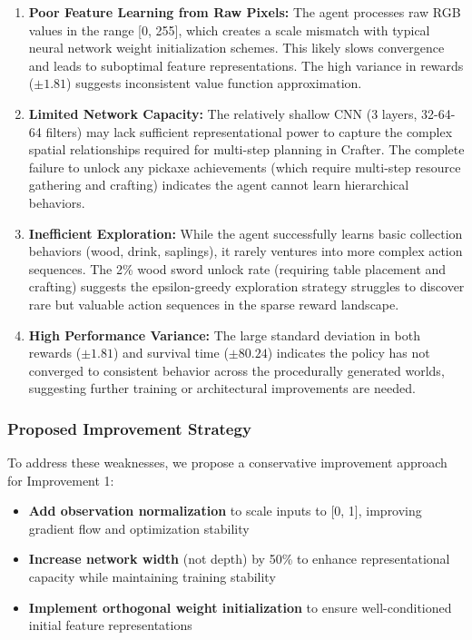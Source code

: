 \documentclass[twocolumn]{article}
\begin{document}
\begin{enumerate}
    \item \textbf{Poor Feature Learning from Raw Pixels:} The agent processes raw RGB values in the range [0, 255], which creates a scale mismatch with typical neural network weight initialization schemes. This likely slows convergence and leads to suboptimal feature representations. The high variance in rewards ($\pm 1.81$) suggests inconsistent value function approximation.
    
    \item \textbf{Limited Network Capacity:} The relatively shallow CNN (3 layers, 32-64-64 filters) may lack sufficient representational power to capture the complex spatial relationships required for multi-step planning in Crafter. The complete failure to unlock any pickaxe achievements (which require multi-step resource gathering and crafting) indicates the agent cannot learn hierarchical behaviors.
    
    \item \textbf{Inefficient Exploration:} While the agent successfully learns basic collection behaviors (wood, drink, saplings), it rarely ventures into more complex action sequences. The 2\% wood sword unlock rate (requiring table placement and crafting) suggests the epsilon-greedy exploration strategy struggles to discover rare but valuable action sequences in the sparse reward landscape.
    
    \item \textbf{High Performance Variance:} The large standard deviation in both rewards ($\pm 1.81$) and survival time ($\pm 80.24$) indicates the policy has not converged to consistent behavior across the procedurally generated worlds, suggesting further training or architectural improvements are needed.
\end{enumerate}

\subsubsection*{Proposed Improvement Strategy}

To address these weaknesses, we propose a conservative improvement approach for Improvement 1:

\begin{itemize}
    \item \textbf{Add observation normalization} to scale inputs to [0, 1], improving gradient flow and optimization stability
    \item \textbf{Increase network width} (not depth) by 50\% to enhance representational capacity while maintaining training stability
    \item \textbf{Implement orthogonal weight initialization} to ensure well-conditioned initial feature representations
\end{itemize}
\end{document}
